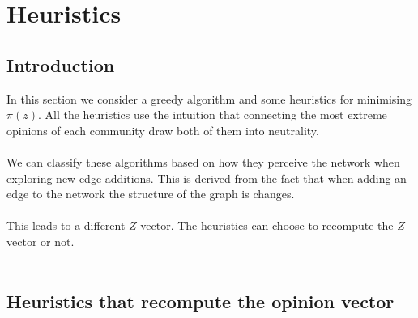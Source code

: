\chapter{Heuristics}
\label{ch:heuristics}

\section{Introduction}
\label{sec:heurIntro}

In this section we  consider a greedy algorithm and some heuristics for minimising $\pi(z)$. All the heuristics use the intuition that connecting the most extreme opinions of each community draw both of them into neutrality. 
\\
\\
We can classify these algorithms based on how they perceive the network when exploring new edge additions. This is derived from the fact that when adding an edge to the network the structure of the graph is changes. 
\\
\\
This leads to a different $Z$ vector. The heuristics can choose to recompute the $Z$ vector or not.
\\
\\
\clearpage


\section{Heuristics that recompute the opinion vector}
\label{sec:netChanges}

